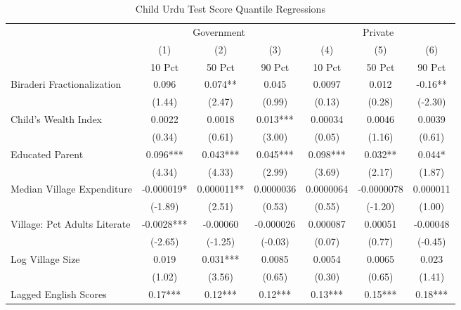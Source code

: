 \begin{sidewaystable}[htbp]\centering
\def\sym#1{\ifmmode^{#1}\else\(^{#1}\)\fi}
\caption{Child Urdu Test Score Quantile Regressions\label{kidsquantsurdu}}
\begin{tabular}{l*{6}{c}}
\toprule
                &\multicolumn{3}{c}{Government}        &\multicolumn{3}{c}{Private}           \\\cmidrule(lr){2-4}\cmidrule(lr){5-7}
                &\multicolumn{1}{c}{(1)}&\multicolumn{1}{c}{(2)}&\multicolumn{1}{c}{(3)}&\multicolumn{1}{c}{(4)}&\multicolumn{1}{c}{(5)}&\multicolumn{1}{c}{(6)}\\
                &\multicolumn{1}{c}{10 Pct}&\multicolumn{1}{c}{50 Pct}&\multicolumn{1}{c}{90 Pct}&\multicolumn{1}{c}{10 Pct}&\multicolumn{1}{c}{50 Pct}&\multicolumn{1}{c}{90 Pct}\\
\midrule
Biraderi Fractionalization&    0.096   &    0.074** &    0.045   &   0.0097   &    0.012   &    -0.16** \\
                &   (1.44)   &   (2.47)   &   (0.99)   &   (0.13)   &   (0.28)   &  (-2.30)   \\
Child's Wealth Index&   0.0022   &   0.0018   &    0.013***&  0.00034   &   0.0046   &   0.0039   \\
                &   (0.34)   &   (0.61)   &   (3.00)   &   (0.05)   &   (1.16)   &   (0.61)   \\
Educated Parent &    0.096***&    0.043***&    0.045***&    0.098***&    0.032** &    0.044*  \\
                &   (4.34)   &   (4.33)   &   (2.99)   &   (3.69)   &   (2.17)   &   (1.87)   \\
Median Village Expenditure&-0.000019*  & 0.000011** &0.0000036   &0.0000064   &-0.0000078   & 0.000011   \\
                &  (-1.89)   &   (2.51)   &   (0.53)   &   (0.55)   &  (-1.20)   &   (1.00)   \\
Village: Pct Adults Literate&  -0.0028***& -0.00060   &-0.000026   & 0.000087   &  0.00051   & -0.00048   \\
                &  (-2.65)   &  (-1.25)   &  (-0.03)   &   (0.07)   &   (0.77)   &  (-0.45)   \\
Log Village Size&    0.019   &    0.031***&   0.0085   &   0.0054   &   0.0065   &    0.023   \\
                &   (1.02)   &   (3.56)   &   (0.65)   &   (0.30)   &   (0.65)   &   (1.41)   \\
Lagged English Scores&     0.17***&     0.12***&     0.12***&     0.13***&     0.15***&     0.18***\\

\end{tabular}
\end{sidewaystable}
